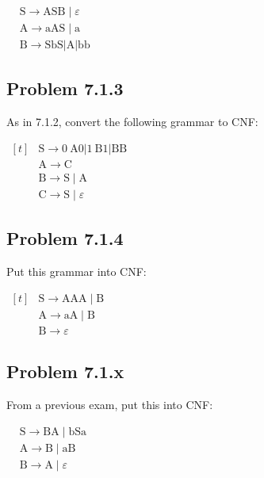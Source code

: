 \documentclass[12pt]{scrbook}
\begin{document}
$ \begin{aligned}
& \mathrm{S} \rightarrow \mathrm{ASB} \mid \varepsilon \\
& \mathrm{A} \rightarrow \mathrm{aAS} \mid \mathrm{a} \\
& \mathrm{B} \rightarrow \mathrm{SbS}|\mathrm{A}| \mathrm{bb}
\end{aligned} $

\subsection*{Problem 7.1.3}As in 7.1.2, convert the following grammar to CNF:

$ \begin{aligned}[t]
& \mathrm{S} \rightarrow 0 \mathrm{~A} 0|1 \mathrm{~B} 1| \mathrm{BB} \\
& \mathrm{A} \rightarrow \mathrm{C} \\
& \mathrm{B} \rightarrow \mathrm{S} \mid \mathrm{A} \\
& \mathrm{C} \rightarrow \mathrm{S} \mid \varepsilon
\end{aligned} $

\subsection*{Problem 7.1.4}Put this grammar into CNF:

$\begin{aligned}[t]
& \mathrm{S} \rightarrow \mathrm{AAA} \mid \mathrm{B} \\
& \mathrm{A} \rightarrow \mathrm{aA} \mid \mathrm{B} \\
& \mathrm{B} \rightarrow \varepsilon
\end{aligned}$

\subsection*{Problem 7.1.x}From a previous exam, put this into CNF:

$\begin{aligned}
& \mathrm{S} \rightarrow \mathrm{BA} \mid \mathrm{bSa} \\
& \mathrm{A} \rightarrow \mathrm{B} \mid \mathrm{aB} \\
& \mathrm{B} \rightarrow \mathrm{A} \mid \varepsilon
\end{aligned}$
\end{document}
